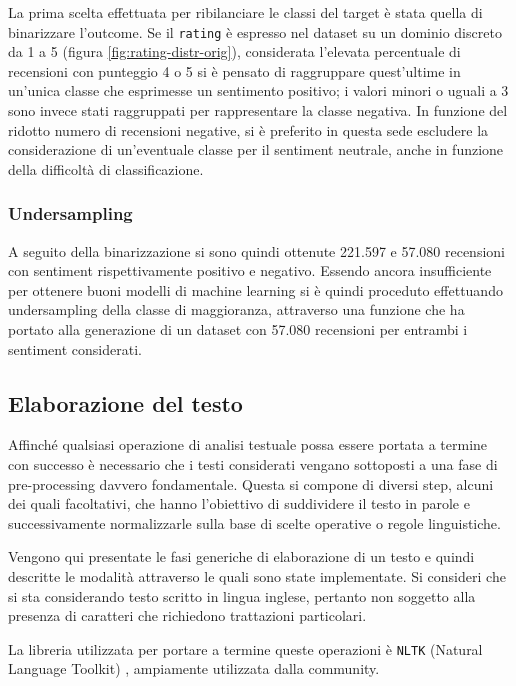 \documentclass[hidelinks, 12pt]{article}
\begin{document}
La prima scelta effettuata per ribilanciare le classi del target è stata quella di binarizzare l'outcome. Se il \texttt{rating} è espresso nel dataset su un dominio discreto da 1 a 5 (figura \ref{fig:rating-distr-orig}), considerata l'elevata percentuale di recensioni con punteggio 4 o 5 si è pensato di raggruppare quest'ultime in un'unica classe che esprimesse un sentimento positivo; i valori minori o uguali a 3 sono invece stati raggruppati per rappresentare la classe negativa. In funzione del ridotto numero di recensioni negative, si è preferito in questa sede escludere la considerazione di un'eventuale classe per il sentiment neutrale, anche in funzione della difficoltà di classificazione.


\subsubsection{Undersampling}

A seguito della binarizzazione si sono quindi ottenute 221.597 e 57.080 recensioni con sentiment rispettivamente positivo e negativo. Essendo ancora insufficiente per ottenere buoni modelli di machine learning si è quindi proceduto effettuando undersampling della classe di maggioranza, attraverso una funzione che ha portato alla generazione di un dataset con 57.080 recensioni per entrambi i sentiment considerati.



\subsection{Elaborazione del testo}
\label{sec:text-elab}

Affinché qualsiasi operazione di analisi testuale possa essere portata a termine con successo è necessario che i testi considerati vengano sottoposti a una fase di pre-processing davvero fondamentale. Questa si compone di diversi step, alcuni dei quali facoltativi, che hanno l'obiettivo di suddividere il testo in parole e successivamente normalizzarle sulla base di scelte operative o regole linguistiche.

Vengono qui presentate le fasi generiche di elaborazione di un testo e quindi descritte le modalità attraverso le quali sono state implementate. Si consideri che si sta considerando testo scritto in lingua inglese, pertanto non soggetto alla presenza di caratteri che richiedono trattazioni particolari.

La libreria utilizzata per portare a termine queste operazioni è \texttt{NLTK} (Natural Language Toolkit) \cite{site:nltk}, ampiamente utilizzata dalla community.
\end{document}

